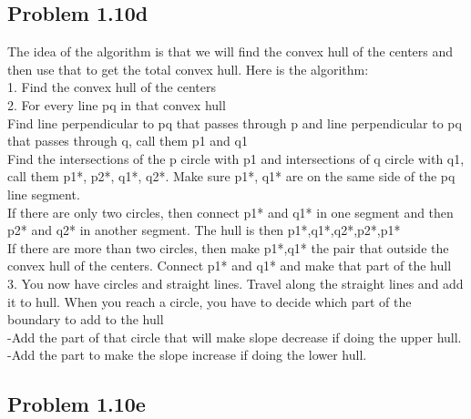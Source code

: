 \documentclass[11pt,psfig]{article}
\begin{document}
\subsection*{Problem 1.10d}

The idea of the algorithm is that we will find the convex hull of the centers and then use that to get the total convex hull. Here is the algorithm:\\
1. Find the convex hull of the centers\\
2. For every line pq in that convex hull\\
			Find line perpendicular to pq that passes through p and line perpendicular to pq that passes through q, call them p1 and q1\\
			Find the intersections of the p circle with p1 and intersections of q circle with q1, call them p1*, p2*, q1*, q2*. Make sure p1*, q1* are on the same side of the pq line segment. \\
			If there are only two circles, then connect p1* and q1* in one segment and then p2* and q2* in another segment. The hull is then p1*,q1*,q2*,p2*,p1*\\
			If there are more than two circles, then make p1*,q1* the pair that outside the convex hull of the centers. Connect p1* and q1* and make that part of the hull\\
3. You now have circles and straight lines. Travel along the straight lines and add it to hull. When you reach a circle, you have to decide which part of the boundary to add to the hull\\
			-Add the part of that circle that will make slope decrease if doing the upper hull.\\
			-Add the part to make the slope increase if doing the lower hull.

\subsection*{Problem 1.10e}
\end{document}
